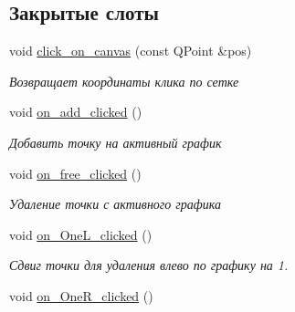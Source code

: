 \subsection*{Закрытые слоты}
\begin{DoxyCompactItemize}
\item 
void \hyperlink{class_main_window_aa518cb3e5c52da2ccb6b886d6e09339d}{click\+\_\+on\+\_\+canvas} (const Q\+Point \&pos)\hypertarget{class_main_window_aa518cb3e5c52da2ccb6b886d6e09339d}{}\label{class_main_window_aa518cb3e5c52da2ccb6b886d6e09339d}

\begin{DoxyCompactList}\small\item\em Возвращает координаты клика по сетке \end{DoxyCompactList}\item 
void \hyperlink{class_main_window_ac5d7fe3c822551a9525b83fb6b3b99d3}{on\+\_\+add\+\_\+clicked} ()\hypertarget{class_main_window_ac5d7fe3c822551a9525b83fb6b3b99d3}{}\label{class_main_window_ac5d7fe3c822551a9525b83fb6b3b99d3}

\begin{DoxyCompactList}\small\item\em Добавить точку на активный график \end{DoxyCompactList}\item 
void \hyperlink{class_main_window_ad7f5879e59277f275c452d99d2d1e923}{on\+\_\+free\+\_\+clicked} ()\hypertarget{class_main_window_ad7f5879e59277f275c452d99d2d1e923}{}\label{class_main_window_ad7f5879e59277f275c452d99d2d1e923}

\begin{DoxyCompactList}\small\item\em Удаление точки с активного графика \end{DoxyCompactList}\item 
void \hyperlink{class_main_window_ac1cc49b084dceb4e44b973819b8bc9cc}{on\+\_\+\+One\+L\+\_\+clicked} ()\hypertarget{class_main_window_ac1cc49b084dceb4e44b973819b8bc9cc}{}\label{class_main_window_ac1cc49b084dceb4e44b973819b8bc9cc}

\begin{DoxyCompactList}\small\item\em Сдвиг точки для удаления влево по графику на 1. \end{DoxyCompactList}\item 
void \hyperlink{class_main_window_afa3f2fb370e2b3c9064880d9aa9a8d14}{on\+\_\+\+One\+R\+\_\+clicked} ()\hypertarget{class_main_window_afa3f2fb370e2b3c9064880d9aa9a8d14}{}\label{class_main_window_afa3f2fb370e2b3c9064880d9aa9a8d14}


\end{DoxyCompactItemize}
